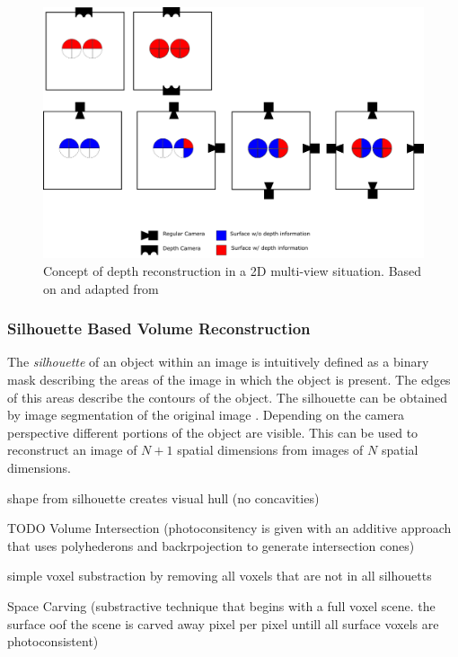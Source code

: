 \begin{figure}[hbt]
	\centering
	\includegraphics[width=1.0\textwidth, keepaspectratio]{resources/multiview}
	\caption{\label{fig:sota:mulitviewtop}Concept of depth reconstruction in a 2D multi-view situation.
	Based on and adapted from \textcite[][]{sonaten2011volume}}
\end{figure}

\subsubsection{Silhouette Based Volume Reconstruction}

The \emph{silhouette} of an object within an image is intuitively defined 
as a binary mask describing the areas of the image in which the object is present. 
The edges of this areas describe the contours of the object.
The silhouette can be obtained by image segmentation of the original image \autocite[][Chap.~2]{zhang2017imageanalysis}.
Depending on the camera perspective different portions of the object are visible.
This can be used to reconstruct an image of $N+1$ spatial dimensions from images of $N$ spatial dimensions.



shape from silhouette creates visual hull (no concavities)
\autocite[][]{laurentini1994hull}

TODO
Volume Intersection (photoconsitency is given with an additive approach that uses polyhederons and backrpojection to generate intersection cones)
\autocite[][]{}

simple voxel substraction by removing all voxels that are not in all silhouetts

Space Carving (substractive technique that begins with a full voxel scene. the surface oof the scene is carved away pixel per pixel untill all surface voxels  are photoconsistent)
\autocite[][]{kutulakos1999spacecarving}

